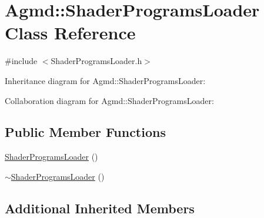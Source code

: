 \hypertarget{class_agmd_1_1_shader_programs_loader}{\section{Agmd\+:\+:Shader\+Programs\+Loader Class Reference}
\label{class_agmd_1_1_shader_programs_loader}
}


{\ttfamily \#include $<$Shader\+Programs\+Loader.\+h$>$}



Inheritance diagram for Agmd\+:\+:Shader\+Programs\+Loader\+:


Collaboration diagram for Agmd\+:\+:Shader\+Programs\+Loader\+:
\subsection*{Public Member Functions}
\begin{DoxyCompactItemize}
\item 
\hyperlink{class_agmd_1_1_shader_programs_loader_a3094a4b1b6ec6db147f94c5fbf02d1ef}{Shader\+Programs\+Loader} ()
\item 
\hyperlink{class_agmd_1_1_shader_programs_loader_a47bc693b61795dce16c61815d2ce5d0f}{$\sim$\+Shader\+Programs\+Loader} ()
\end{DoxyCompactItemize}
\subsection*{Additional Inherited Members}


